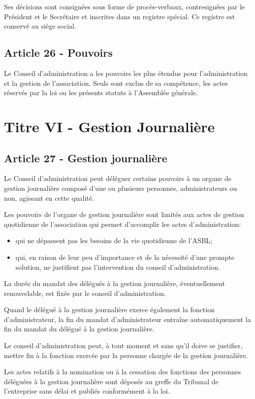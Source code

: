 \documentclass[12pt]{article}
\begin{document}
Ses décisions sont consignées sous forme de procès-verbaux, contresignées par le Président et le Secrétaire et inscrites dans un registre spécial. Ce registre est conservé au siège social.
\subsection*{Article 26 - Pouvoirs}
Le Conseil d'administration a les pouvoirs les plus étendus pour l'administration et la gestion de l'association. Seuls sont exclus de sa compétence, les actes réservés par la loi ou les présents statuts à l'Assemblée générale.

\section*{Titre VI - Gestion Journalière}

\subsection*{Article 27 - Gestion journalière}
Le Conseil d'administration peut déléguer certains pouvoirs à un organe de gestion journalière composé d'une ou plusieurs personnes, administrateurs ou non, agissant en cette qualité.

Les pouvoirs de l'organe de gestion journalière sont limités aux actes de gestion quotidienne de l'association qui permet d'accomplir les actes d'administration:
\begin{itemize}
\item qui ne dépassent pas les besoins de la vie quotidienne de l'ASBL;
\item qui, en raison de leur peu d'importance et de la nécessité d'une prompte solution, ne justifient pas l'intervention du conseil d'administration.
\end{itemize}

La durée du mandat des délégués à la gestion journalière, éventuellement renouvelable, est fixée par le conseil d'administration.

Quand le délégué à la gestion journalière exerce également la fonction d'administrateur, la fin du mandat d'administrateur entraîne automatiquement la fin du mandat du délégué à la gestion journalière.

Le conseil d'administration peut, à tout moment et sans qu'il doive se justifier, mettre fin à la fonction exercée par la personne chargée de la gestion journalière.

Les actes relatifs à la nomination ou à la cessation des fonctions des personnes déléguées à la gestion journalière sont déposés au greffe du Tribunal de l'entreprise sans délai et publiés conformément à la loi.
\end{document}
